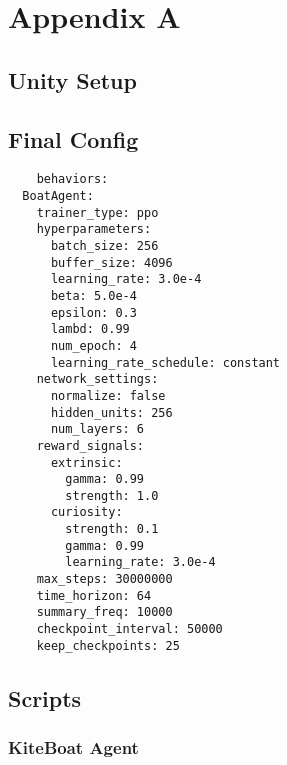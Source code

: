 %
%

\chapter{Appendix A}\label{app:app01}

\section{Unity Setup}\label{sec:unity_setup}

\section{Final Config}\label{config}
\begin{adjustbox}{width=\textwidth/2}
\begin{lstlisting}
    behaviors:
  BoatAgent:
    trainer_type: ppo
    hyperparameters:
      batch_size: 256
      buffer_size: 4096
      learning_rate: 3.0e-4
      beta: 5.0e-4
      epsilon: 0.3
      lambd: 0.99
      num_epoch: 4
      learning_rate_schedule: constant
    network_settings:
      normalize: false
      hidden_units: 256
      num_layers: 6
    reward_signals:
      extrinsic:
        gamma: 0.99
        strength: 1.0
      curiosity:
        strength: 0.1
        gamma: 0.99
        learning_rate: 3.0e-4
    max_steps: 30000000
    time_horizon: 64
    summary_freq: 10000
    checkpoint_interval: 50000
    keep_checkpoints: 25
\end{lstlisting}
\end{adjustbox}

\section{Scripts}

\subsection{KiteBoat Agent}\label{sec:kiteboat_agent}
\lstset{
  breaklines=true,   %
  breakatwhitespace=false,    %
}
\lstset{
  basicstyle=\ttfamily\small,
  breaklines=true
}
  
